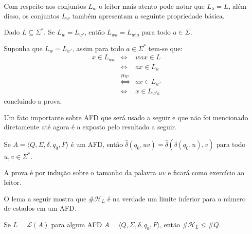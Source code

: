Com respeito aos conjuntos $L_w$ o leitor mais atento pode notar que $L_\lambda = L$, além disso,  os conjuntos $L_w$ também apresentam a seguinte propriedade básica.

\begin{proposicao}
  Dado $L \subseteq \Sigma^*$. Se $L_w = L_{w'}$, então $L_{wa} = L_{w'a}$ para todo $a \in \Sigma$.
\end{proposicao}

\begin{prova}
	Suponha que $L_w = L_{w'}$, assim para todo $a \in \Sigma^*$ tem-se que:
	\begin{eqnarray*}
		x \in L_{wa} &\Longleftrightarrow & wax \in L\\
		& \Longleftrightarrow  & ax \in L_w\\
		& \stackrel{Hip.}{\Longleftrightarrow} & ax \in L_{w'}\\
		& \Longleftrightarrow  & x \in L_{w'a}
	\end{eqnarray*}
	concluindo a prova.
\end{prova}

Um fato importante sobre AFD que será usado a seguir e que não foi mencionado diretamente até agora é o exposto pelo resultado a seguir.

\begin{proposicao}\label{prop:AssociatividadeDelta}
	Se $A = \langle Q, \Sigma, \delta, q_0, F\rangle$ é um AFD, então $\widehat{\delta}(q_0, uv) = \widehat{\delta}( \widehat{\delta}(q_0, u), v)$ para todo $u,v \in \Sigma^*$.
\end{proposicao}

\begin{prova}
	A prova é por indução sobre o tamanho da palavra $uv$ e ficará como exercício ao leitor.
\end{prova}

O lema a seguir mostra que $\# \mathcal{H}_L$ é na verdade um limite inferior para o número de estados em um AFD. 

\begin{lema}\label{lema:LimiteInferiorEstados}
	Se $L = \mathcal{L}(A)$ para algum AFD $A = \langle Q, \Sigma, \delta, q_0, F\rangle$, então $\# \mathcal{H}_L \leq \# Q$.
\end{lema}


